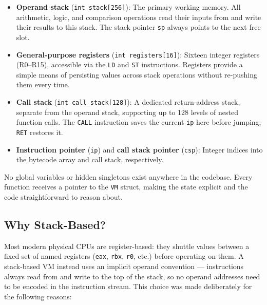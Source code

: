 \begin{itemize}
    \item \textbf{Operand stack} (\texttt{int stack[256]}): The primary working memory. All arithmetic, logic, and comparison operations read their inputs from and write their results to this stack. The stack pointer \texttt{sp} always points to the next free slot.
    \item \textbf{General-purpose registers} (\texttt{int registers[16]}): Sixteen integer registers (R0–R15), accessible via the \texttt{LD} and \texttt{ST} instructions. Registers provide a simple means of persisting values across stack operations without re-pushing them every time.
    \item \textbf{Call stack} (\texttt{int call\_stack[128]}): A dedicated return-address stack, separate from the operand stack, supporting up to 128 levels of nested function calls. The \texttt{CALL} instruction saves the current \texttt{ip} here before jumping; \texttt{RET} restores it.
    \item \textbf{Instruction pointer} (\texttt{ip}) and \textbf{call stack pointer} (\texttt{csp}): Integer indices into the bytecode array and call stack, respectively.
\end{itemize}

No global variables or hidden singletons exist anywhere in the codebase. Every function receives a pointer to the \texttt{VM} struct, making the state explicit and the code straightforward to reason about.

\subsection*{Why Stack-Based?}

Most modern physical CPUs are register-based: they shuttle values between a fixed set of named registers (\texttt{eax}, \texttt{rbx}, \texttt{r0}, etc.) before operating on them. A stack-based VM instead uses an implicit operand convention — instructions always read from and write to the top of the stack, so no operand addresses need to be encoded in the instruction stream. This choice was made deliberately for the following reasons:


